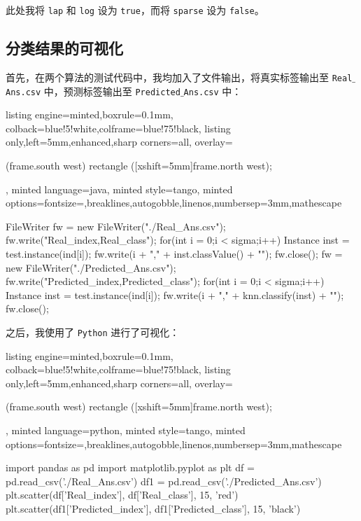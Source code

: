 \documentclass[a4paper, 11pt, cn]{elegantpaper}
\begin{document}
此处我将 \texttt{lap} 和 \texttt{log} 设为 \texttt{true}，而将 \texttt{sparse} 设为 \texttt{false}。

\subsection{分类结果的可视化}

首先，在两个算法的测试代码中，我均加入了文件输出，将真实标签输出至 \texttt{Real$\_$Ans.csv} 中，预测标签输出至 \texttt{Predicted$\_$Ans.csv} 中：

\begin{tcblisting}{listing engine=minted,boxrule=0.1mm,
    colback=blue!5!white,colframe=blue!75!black,
    listing only,left=5mm,enhanced,sharp corners=all,
    overlay={\begin{tcbclipinterior} (frame.south west)
    rectangle ([xshift=5mm]frame.north west);\end{tcbclipinterior}},
    minted language=java,
    minted style=tango,
    minted options={fontsize=\small,breaklines,autogobble,linenos,numbersep=3mm,mathescape}}
FileWriter fw = new FileWriter("./Real_Ans.csv");
fw.write("Real_index,Real_class\n");
for(int i = 0;i < sigma;i++)
{
    Instance inst = test.instance(ind[i]);
    fw.write(i + "," + inst.classValue() + "\n");
}
fw.close();
fw = new FileWriter("./Predicted_Ans.csv");
fw.write("Predicted_index,Predicted_class\n");
for(int i = 0;i < sigma;i++)
{
    Instance inst = test.instance(ind[i]);
    fw.write(i + "," + knn.classify(inst) + "\n");
}
fw.close();
\end{tcblisting}

之后，我使用了 \texttt{Python} 进行了可视化：

\begin{tcblisting}{listing engine=minted,boxrule=0.1mm,
    colback=blue!5!white,colframe=blue!75!black,
    listing only,left=5mm,enhanced,sharp corners=all,
    overlay={\begin{tcbclipinterior} (frame.south west)
    rectangle ([xshift=5mm]frame.north west);\end{tcbclipinterior}},
    minted language=python,
    minted style=tango,
    minted options={fontsize=\small,breaklines,autogobble,linenos,numbersep=3mm,mathescape}}
import pandas as pd
import matplotlib.pyplot as plt
df = pd.read_csv('./Real_Ans.csv')
df1 = pd.read_csv('./Predicted_Ans.csv')
plt.scatter(df['Real_index'], df['Real_class'], 15, 'red')
plt.scatter(df1['Predicted_index'], df1['Predicted_class'], 15, 'black')
\end{tcblisting}
\end{document}
